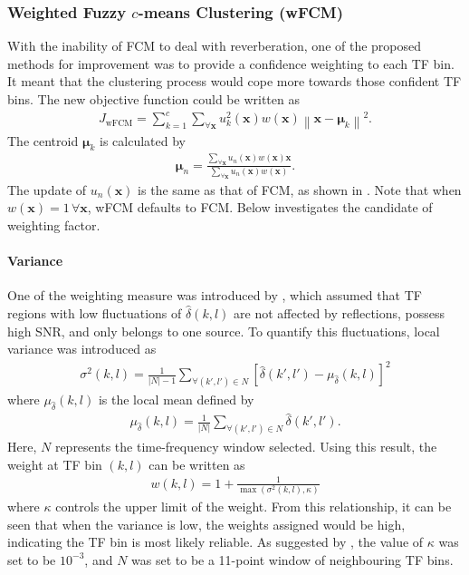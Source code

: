 \documentclass[a4paper,twoside,12pt,hidelinks]{article}
\begin{document}
\subsubsection{Weighted Fuzzy $c$-means Clustering (wFCM)}
With the inability of FCM to deal with reverberation, one of the proposed methods for improvement was to provide a confidence weighting to each TF bin. It meant that the clustering process would cope more towards those confident TF bins. The new objective function could be written as
\begin{align}
J_\text{wFCM} =\sum _{k=1}^{c}\sum_{\forall\mathbf{x}}u_k^2(\mathbf{x})w(\textbf{x})\left\|\mathbf{x} -{\boldsymbol{\mu}}_{k}\right\|^{2}.
\end{align}
The centroid ${\boldsymbol{\mu}}_{k}$ is calculated by
\begin{align}
\boldsymbol{\mu}_n = \frac{\sum_{\forall \mathbf{x}} u_n(\mathbf{x})w(\textbf{x})\mathbf{x}}{\sum_{\forall \mathbf{x}} u_n(\mathbf{x})w(\textbf{x})}.
\end{align}
The update of $u_n(\mathbf{x})$ is the same as that of FCM, as shown in . Note that when $w(\textbf{x})=1 \,\forall \textbf{x}$, wFCM defaults to FCM. Below investigates the candidate of weighting factor.

\paragraph{Variance}
One of the weighting measure was introduced by \cite{kuhnerobust}, which assumed that TF regions with low fluctuations of $\hat{\delta}(k,l)$ are not affected by reflections, possess high SNR, and only belongs to one source. To quantify this fluctuations, local variance was introduced as
\begin{align}
\sigma^2(k,l) = \frac{1}{|N|-1} \sum_{\forall(k',l')\in N}[\hat{\delta}(k',l')-\mu_{\hat{\delta}}(k,l)]^2
\end{align}
where $\mu_{\hat{\delta}}(k,l)$ is the local mean defined by
\begin{align}
\mu_{\hat{\delta}}(k,l) = \frac{1}{|N|}\sum_{\forall(k',l')\in N}\hat{\delta}(k',l').
\end{align}
Here, $N$ represents the time-frequency window selected. Using this result, the weight at TF bin $(k,l)$ can be written as
\begin{align}
w(k,l)=1+\frac{1}{\max(\sigma^2(k,l),\kappa)}
\end{align}
where $\kappa$ controls the upper limit of the weight. From this relationship, it can be seen that when the variance is low, the weights assigned would be high, indicating the TF bin is most likely reliable. As suggested by \cite{kuhnerobust}, the value of $\kappa$ was set to be $10^{-3}$, and $N$ was set to be a 11-point window of neighbouring TF bins.
\end{document}
